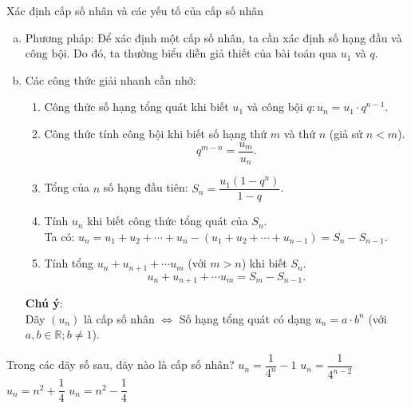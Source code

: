 \begin{dang}{Xác định cấp số nhân và các yếu tố của cấp số nhân}
\begin{enumerate}[a)]
\item Phương pháp: Để xác định một cấp số nhân, ta cần xác định số hạng đầu và công bội. Do đó, ta thường biểu diễn giả thiết của bài toán qua $u_1$ và $q$.
\item Các công thức giải nhanh cần nhớ:
\begin{enumerate}[+]
	\item Công thức số hạng tổng quát khi biết $u_1$ và công bội $q: u_n=u_1 \cdot q^{n-1}.$
	\item Công thức tính công bội khi biết số hạng thứ $m$ và thứ $n$ (giả sử $n<m$).\\
	$$q^{m-n}=\dfrac{u_m}{u_n}.$$
	\item Tổng của $n$ số hạng đầu tiên: $S_n=\dfrac{u_1(1-q^n)}{1-q}$.
	\item Tính $u_n$ khi biết công thức tổng quát của $S_n$.\\
	Ta có: $u_n=u_1+u_2+\cdots+u_n-\left(u_1+u_2+\cdots+  u_{n-1}\right)=S_n-S_{n-1}.$
	\item Tính tổng $u_n+u_{n+1}+\cdots u_{m}$ (với $m>n$) khi biết $S_n$.
	$$u_n+u_{n+1}+\cdots u_{m} = S_{m} -S_{n-1}.$$
\end{enumerate}
\textbf{Chú ý}: \\
Dãy $(u_n)$ là cấp số nhân $\Leftrightarrow$ Số hạng tổng quát có dạng $u_n=a\cdot b^n$ (với $a, b \in \mathbb{R}; b \ne 1$).
\end{enumerate}
\end{dang}
\begin{vd}%
	Trong các dãy số sau, dãy nào là cấp số nhân?
	\choice
	{$u_n=\dfrac{1}{4^n}-1$}
	{\True $u_n=\dfrac{1}{4^{n-2}}$}
	{$u_n=n^2+\dfrac{1}{4}$}
	{$u_n=n^2-\dfrac{1}{4}$}
\end{vd}
